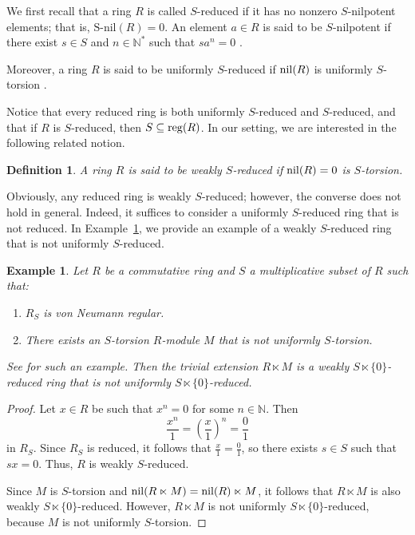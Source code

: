 \documentclass[12pt]{article}
\newtheorem{defn}[thm]{\bf Definition}
\newtheorem{exmp}[thm]{\bf Example}
\def\Snil{\mathrm{S\text{-}nil}}
\def\nil{{\rm nil}}
\def\reg{{\rm reg}}
\begin{document}
We first recall that a ring \(R\) is called  \(S\)-reduced if it has no nonzero \(S\)-nilpotent elements; that is, \(\Snil(R) = 0\). An element \(a \in R\) is said to be \(S\)-nilpotent if there exist \(s \in S\) and \(n \in \mathbb{N}^*\) such that \(sa^n = 0\) \cite{Ers1}.


Moreover, a ring \( R \) is said to be uniformly \( S \)-reduced if \( \nil(R) \) is uniformly \( S \)-torsion \cite{Kim2}.

Notice that every reduced ring is both uniformly \( S \)-reduced and \( S \)-reduced, and that if \( R \) is \( S \)-reduced, then \( S \subseteq \reg(R) \). In our setting, we are interested in the following related notion.

\begin{defn}
A ring \( R \) is said to be weakly \( S \)-reduced if \( \nil(R) = 0 \) is \( S \)-torsion.
\end{defn}


Obviously, any reduced ring is weakly \( S \)-reduced; however, the converse does not hold in general. Indeed, it suffices to consider a uniformly \( S \)-reduced ring that is not reduced. In Example~\ref{exmp-weakly-s-reduced-not-u-s-reduced}, we provide an example of a weakly \( S \)-reduced ring that is not uniformly \( S \)-reduced. 

\begin{exmp}\label{exmp-weakly-s-reduced-not-u-s-reduced} 
Let \( R \) be a commutative ring and \( S \) a multiplicative subset of \( R \) such that:
\begin{enumerate}
    \item \( R_S \) is von Neumann regular.
    \item There exists an \( S \)-torsion \( R \)-module \( M \) that is not uniformly \( S \)-torsion.
\end{enumerate}
See \cite[Example~3.15]{Zha4} for such an example. Then the trivial extension \( R \ltimes M \) is a weakly \( S \ltimes \{0\} \)-reduced ring that is not uniformly \( S \ltimes \{0\} \)-reduced.
\end{exmp}

\begin{proof}
Let \( x \in R \) be such that \( x^n = 0 \) for some \( n \in \mathbb{N} \). Then 
\[
\frac{x^n}{1} = \left( \frac{x}{1} \right)^n = \frac{0}{1}
\]
in \( R_S \). Since \( R_S \) is reduced, it follows that \( \frac{x}{1} = \frac{0}{1} \), so there exists \( s \in S \) such that \( sx = 0 \). Thus, \( R \) is weakly \( S \)-reduced. 

Since \( M \) is \( S \)-torsion and \( \nil(R \ltimes M) = \nil(R) \ltimes M \), it follows that \( R \ltimes M \) is also weakly \( S \ltimes \{0\} \)-reduced. However, \( R \ltimes M \) is not uniformly \( S \ltimes \{0\} \)-reduced, because \( M \) is not uniformly \( S \)-torsion.
\end{proof}
\end{document}
